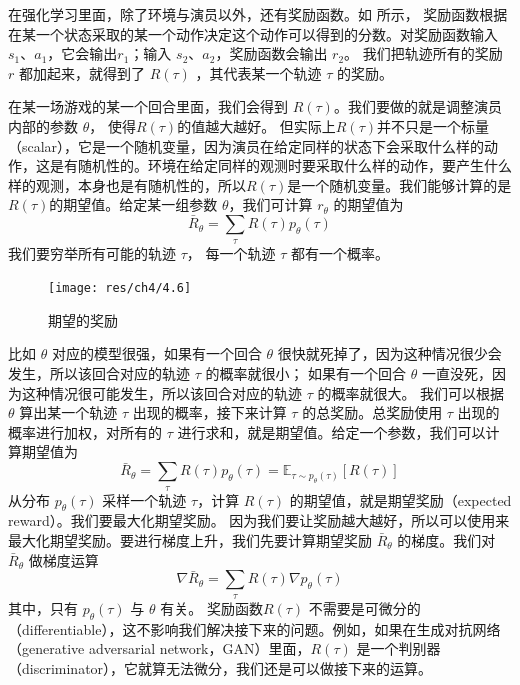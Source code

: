 在强化学习里面，除了环境与演员以外，还有奖励函数。如 所示，
奖励函数根据在某一个状态采取的某一个动作决定这个动作可以得到的分数。对奖励函数输入 $s_1$、$a_1$，它会输出$r_1$；输入 $s_2$、$a_2$，奖励函数会输出 $r_2$。 我们把轨迹所有的奖励 $r$ 都加起来，就得到了 $R(\tau)$ ，其代表某一个轨迹 $\tau$ 的奖励。

在某一场游戏的某一个回合里面，我们会得到 $R(\tau)$。我们要做的就是调整演员内部的参数 $\theta$， 使得$R(\tau)$的值越大越好。 
但实际上$R(\tau)$并不只是一个标量（scalar），它是一个随机变量，因为演员在给定同样的状态下会采取什么样的动作，这是有随机性的。环境在给定同样的观测时要采取什么样的动作，要产生什么样的观测，本身也是有随机性的，所以$R(\tau)$是一个随机变量。我们能够计算的是$R(\tau)$的期望值。给定某一组参数 $\theta$，我们可计算 $r_{\theta}$ 的期望值为
\begin{equation}
    \label{eq:}
    \bar{R}_{\theta}=\sum_{\tau} R(\tau) p_{\theta}(\tau)
\end{equation}
我们要穷举所有可能的轨迹 $\tau$， 每一个轨迹 $\tau$ 都有一个概率。
\begin{figure}[hbt]
    \centering
    \texttt{[image: res/ch4/4.6]}
    \caption{期望的奖励}
    \label{fig:fig4.6}
\end{figure}
比如 $\theta$ 对应的模型很强，如果有一个回合 $\theta$ 很快就死掉了，因为这种情况很少会发生，所以该回合对应的轨迹 $\tau$ 的概率就很小；
如果有一个回合 $\theta$ 一直没死，因为这种情况很可能发生，所以该回合对应的轨迹 $\tau$ 的概率就很大。
我们可以根据 $\theta$ 算出某一个轨迹 $\tau$ 出现的概率，接下来计算 $\tau$ 的总奖励。总奖励使用 $\tau$ 出现的概率进行加权，对所有的 $\tau$ 进行求和，就是期望值。给定一个参数，我们可以计算期望值为
\begin{equation}
    \label{eq:}
    \bar{R}_{\theta}=\sum_{\tau} R(\tau) p_{\theta}(\tau)=\mathbb{E}_{\tau \sim p_{\theta}(\tau)}[R(\tau)]
\end{equation}
从分布 $p_{\theta}(\tau)$ 采样一个轨迹 $\tau$，计算 $R(\tau)$ 的期望值，就是期望奖励（expected reward）。我们要最大化期望奖励。
因为我们要让奖励越大越好，所以可以使用来最大化期望奖励。要进行梯度上升，我们先要计算期望奖励 $\bar{R}_{\theta}$ 的梯度。我们对 $\bar{R}_{\theta}$ 做梯度运算
\begin{equation}
    \label{eq:}
    \nabla \bar{R}_{\theta}=\sum_{\tau} R(\tau) \nabla p_{\theta}(\tau)
\end{equation}
其中，只有 $p_{\theta}(\tau)$ 与 $\theta$ 有关。
奖励函数$R(\tau)$ 不需要是可微分的（differentiable），这不影响我们解决接下来的问题。例如，如果在生成对抗网络（generative adversarial network，GAN）里面，$R(\tau)$ 是一个判别器（discriminator），它就算无法微分，我们还是可以做接下来的运算。


